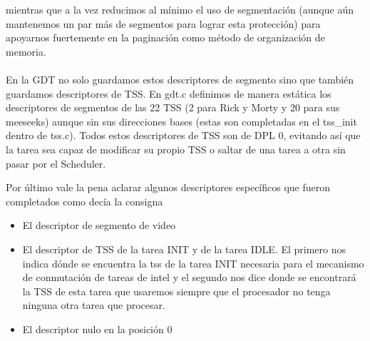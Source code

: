 mientras que a la vez reducimos al mínimo el uso de segmentación (aunque aún mantenemos un par más de segmentos para lograr esta protección)
para apoyarnos fuertemente en la paginación como método de organización de memoria.
\\\\
En la GDT no solo guardamos estos descriptores de segmento sino que también guardamos descriptores de TSS.
En gdt.c definimos de manera estática los descriptores de segmentos de las 22 TSS (2 para Rick y Morty y 20 para sus meeseeks) aunque sin sus direcciones bases (estas son completadas en el tss_init dentro de tss.c).
Todos estos descriptores de TSS son de DPL 0, evitando así que la tarea sea capaz de modificar su propio TSS o saltar de una tarea a otra sin pasar por el Scheduler.

Por último vale la pena aclarar algunos descriptores específicos que fueron completados como decía la consigna
\begin{itemize}
   \item El descriptor de segmento de video
   \item El descriptor de TSS de la tarea INIT y de la tarea IDLE. El primero nos indica dónde se encuentra la tss de la tarea INIT necesaria para el mecanismo de conmutación de tareas de intel  y el segundo nos dice donde se encontrará la TSS de esta tarea que usaremos siempre que el procesador no tenga ninguna otra tarea que procesar.
   \item El descriptor nulo en la posición 0
\end{itemize}

